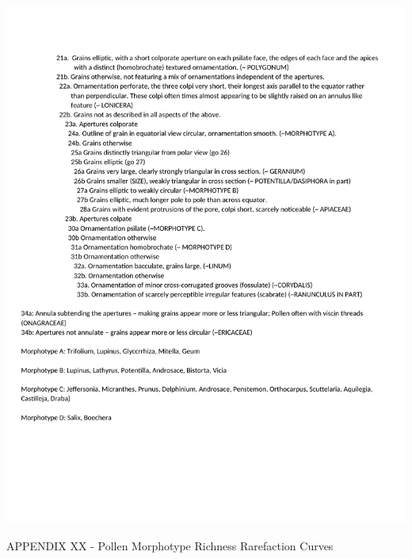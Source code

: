 \documentclass[
]{article}
\begin{document}
\includegraphics{../graphics/assorted/RMBL_pollen_key-2.pdf}

\newpage

APPENDIX XX - Pollen Morphotype Richness Rarefaction Curves
\end{document}
